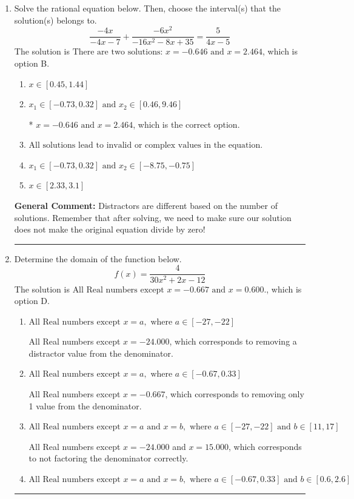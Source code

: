 \documentclass{extbook}[14pt]
\newcommand{\litem}[1]{\item #1

\rule{\textwidth}{0.4pt}}
\begin{document}
\begin{enumerate}\litem{
Solve the rational equation below. Then, choose the interval(s) that the solution(s) belongs to.
\[ \frac{-4x}{-4x -7} + \frac{-6x^{2}}{-16x^{2} -8 x + 35} = \frac{5}{4x -5} \]The solution is \( \text{There are two solutions: } x = -0.646 \text{ and } x = 2.464 \), which is option B.\begin{enumerate}[label=\Alph*.]
\item \( x \in [0.45,1.44] \)


\item \( x_1 \in [-0.73, 0.32] \text{ and } x_2 \in [0.46,9.46] \)

* $x = -0.646 \text{ and } x = 2.464$, which is the correct option.
\item \( \text{All solutions lead to invalid or complex values in the equation.} \)


\item \( x_1 \in [-0.73, 0.32] \text{ and } x_2 \in [-8.75,-0.75] \)


\item \( x \in [2.33,3.1] \)


\end{enumerate}

\textbf{General Comment:} Distractors are different based on the number of solutions. Remember that after solving, we need to make sure our solution does not make the original equation divide by zero!
}
\litem{
Determine the domain of the function below.
\[ f(x) = \frac{4}{30x^{2} +2 x -12} \]The solution is \( \text{All Real numbers except } x = -0.667 \text{ and } x = 0.600. \), which is option D.\begin{enumerate}[label=\Alph*.]
\item \( \text{All Real numbers except } x = a, \text{ where } a \in [-27, -22] \)

All Real numbers except $x = -24.000$, which corresponds to removing a distractor value from the denominator.
\item \( \text{All Real numbers except } x = a, \text{ where } a \in [-0.67, 0.33] \)

All Real numbers except $x = -0.667$, which corresponds to removing only 1 value from the denominator.
\item \( \text{All Real numbers except } x = a \text{ and } x = b, \text{ where } a \in [-27, -22] \text{ and } b \in [11, 17] \)

All Real numbers except $x = -24.000$ and $x = 15.000$, which corresponds to not factoring the denominator correctly.
\item \( \text{All Real numbers except } x = a \text{ and } x = b, \text{ where } a \in [-0.67, 0.33] \text{ and } b \in [0.6, 2.6] \)


\end{enumerate}}
\end{enumerate}
\end{document}
